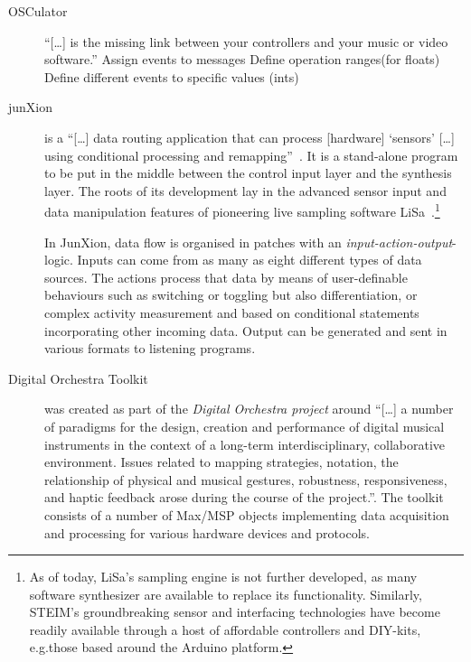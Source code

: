 \documentclass{article}
\begin{document}
\begin{description}
	\item[OSCulator] 
		\enquote{[\dots] is the missing link between your controllers and your music or video software.}
		Assign events to messages
		Define operation ranges(for floats)
		Define different events to specific values (ints) 
	\item[junXion] 
		is a \enquote{[\dots] data routing application that can process [hardware] `sensors' [\dots] using conditional processing and remapping}~\cite{-jun}. 
		It is a stand-alone program to be put in the middle between the control input layer and the synthesis layer.
The roots of its development lay in the advanced sensor input and data manipulation features of pioneering live sampling software LiSa~\cite{-jun}.\footnote{As of today, LiSa's sampling engine is not further developed, as many software synthesizer are available to replace its functionality. 
Similarly, STEIM's groundbreaking sensor and interfacing technologies have become readily available through a host of affordable controllers and DIY-kits, e.g.those based around the Arduino platform.}

In JunXion, data flow is organised in patches with an \emph{input-action-output}-logic. 
Inputs can come from as many as eight different types of data sources.
The actions process that data by means of user-definable behaviours such as switching or toggling but also differentiation, or complex activity measurement and based on conditional statements incorporating other incoming data. 
Output can be generated and sent in various formats to listening programs.

	\item[Digital Orchestra Toolkit] \cite{-dot} was created as part of the \emph{Digital Orchestra project} around \enquote{[\dots] a number of paradigms for the design, creation and performance of digital musical instruments in the context of a long-term interdisciplinary, collaborative environment. 
	Issues related to mapping strategies, notation, the relationship of physical and musical gestures, robustness, responsiveness, and haptic feedback arose during the course of the project.}\cite{ferguson-2009}. 
	The toolkit consists of a number of Max/MSP objects implementing data acquisition and processing for various hardware devices and protocols.
	

\end{description}
\end{document}
